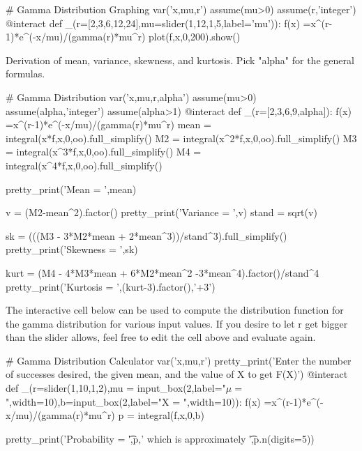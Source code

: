 \documentclass[10pt,]{book}
\numberwithin{equation}{section}
\begin{document}
%
\par
\hypertarget{p-1142}{}%
\leavevmode%
%
\par
\hypertarget{p-1143}{}%
\leavevmode%
\begin{sageinput}
# Gamma Distribution Graphing
var('x,mu,r')
assume(mu>0)
assume(r,'integer')
@interact
def _(r=[2,3,6,12,24],mu=slider(1,12,1,5,label='mu')):
    f(x) =x^(r-1)*e^(-x/mu)/(gamma(r)*mu^r)
    plot(f,x,0,200).show()
\end{sageinput}
%
\par
\hypertarget{p-1144}{}%
Derivation of mean, variance, skewness, and kurtosis. Pick "alpha" for the general formulas. \leavevmode%
\begin{sageinput}
# Gamma Distribution
var('x,mu,r,alpha')
assume(mu>0)
assume(alpha,'integer')
assume(alpha>1)
@interact
def _(r=[2,3,6,9,alpha]):
    f(x) =x^(r-1)*e^(-x/mu)/(gamma(r)*mu^r)
    mean = integral(x*f,x,0,oo).full_simplify()
    M2 = integral(x^2*f,x,0,oo).full_simplify()
    M3 = integral(x^3*f,x,0,oo).full_simplify()
    M4 = integral(x^4*f,x,0,oo).full_simplify()
    
    pretty_print('Mean = ',mean)
    
    v = (M2-mean^2).factor()
    pretty_print('Variance = ',v)
    stand = sqrt(v)
    
    sk = (((M3 - 3*M2*mean + 2*mean^3))/stand^3).full_simplify()
    pretty_print('Skewness = ',sk)
    
    kurt = (M4 - 4*M3*mean + 6*M2*mean^2 -3*mean^4).factor()/stand^4
    pretty_print('Kurtosis = ',(kurt-3).factor(),'+3')
\end{sageinput}
%
\par
\hypertarget{p-1145}{}%
The interactive cell below can be used to compute the distribution function for the gamma distribution for various input values. If you desire to let r get bigger than the slider allows, feel free to edit the cell above and evaluate again. \leavevmode%
\begin{sageinput}
# Gamma Distribution Calculator
var('x,mu,r')
pretty_print('Enter the number of successes desired, the given mean, and the value of X to get F(X)')
@interact
def _(r=slider(1,10,1,2),mu = input_box(2,label="$\mu = $",width=10),b=input_box(2,label="X = ",width=10)):
    f(x) =x^(r-1)*e^(-x/mu)/(gamma(r)*mu^r)
    p = integral(f,x,0,b)
    
    pretty_print('Probability = \t',p,' which is approximately \t',p.n(digits=5))
\end{sageinput}
\end{document}
